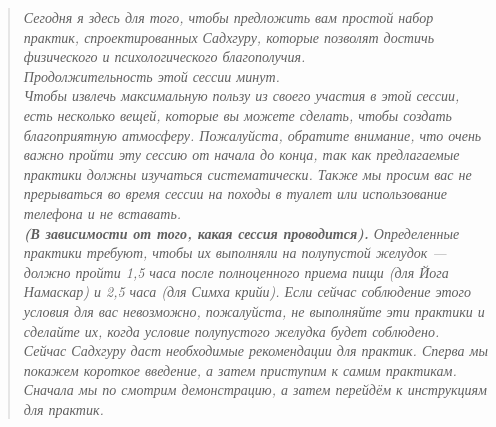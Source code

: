\begin{quote}\emph{
Сегодня я здесь для того, чтобы предложить вам простой набор практик,
спроектированных Садхгуру, которые позволят достичь физического и
психологического благополучия.
\\
Продолжительность этой сессии \underline{\qquad} минут.
\\
Чтобы извлечь максимальную пользу из своего участия в этой сессии, есть несколько вещей, которые вы можете сделать, чтобы создать благоприятную атмосферу. Пожалуйста, обратите внимание, что очень важно пройти эту сессию от начала до конца, так как предлагаемые практики должны изучаться систематически. Также мы просим вас не прерываться во время сессии на походы в туалет или использование телефона и не вставать.
\\
\textbf{(В зависимости от того, какая сессия проводится).} Определенные практики
требуют, чтобы их выполняли на полупустой желудок — должно пройти 1,5
часа после полноценного приема пищи (для Йога Намаскар) и 2,5 часа (для
Симха крийи). Если сейчас соблюдение этого условия для вас невозможно,
пожалуйста, не выполняйте эти практики и сделайте их, когда условие
полупустого желудка будет соблюдено.
\\
Сейчас Садхгуру даст необходимые рекомендации для практик. Сперва мы покажем короткое введение, а затем приступим к самим практикам. Сначала мы по смотрим демонстрацию, а затем перейдём к инструкциям для практик.
}\end{quote}

